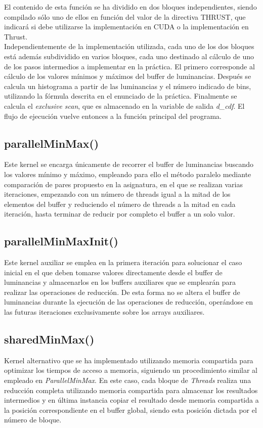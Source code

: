 \documentclass[10pt,oneside,a4paper]{article}
\begin{document}
El contenido de esta función se ha dividido en dos bloques independientes, siendo compilado sólo uno de ellos en función del valor de la directiva THRUST, que indicará si debe utilizarse la implementación en CUDA o la implementación en Thrust.\\

Independientemente de la implementación utilizada, cada uno de los dos bloques está además subdividido en varios bloques, cada uno destinado al cálculo de uno de los pasos intermedios a implementar en la práctica. El primero corresponde al cálculo de los valores mínimos y máximos del buffer de luminancias. Después se calcula un histograma a partir de las luminancias y el número indicado de bins, utilizando la fórmula descrita en el enunciado de la práctica. Finalmente se calcula el \textit{exclusive scan}, que es almacenado en la variable de salida \textit{d\_cdf}. El flujo de ejecución vuelve entonces a la función principal del programa.

\subsection{parallelMinMax()}
Este kernel se encarga únicamente de recorrer el buffer de luminancias buscando los valores mínimo y máximo, empleando para ello el método paralelo mediante comparación de pares propuesto en la asignatura, en el que se realizan varias iteraciones, empezando con un número de threads igual a la mitad de los elementos del buffer y reduciendo el número de threads a la mitad en cada iteración, hasta terminar de reducir por completo el buffer a un solo valor.

\subsection{parallelMinMaxInit()}
Este kernel auxiliar se emplea en la primera iteración para solucionar el caso inicial en el que deben tomarse valores directamente desde el buffer de luminancias y almacenarlos en los buffers auxiliares que se emplearán para realizar las operaciones de reducción. De esta forma no se altera el buffer de luminancias durante la ejecución de las operaciones de reducción, operándose en las futuras iteraciones exclusivamente sobre los arrays auxiliares.

\subsection{sharedMinMax()}
Kernel alternativo que se ha implementado utilizando memoria compartida para optimizar los tiempos de acceso a memoria, siguiendo un procedimiento similar al empleado en \textit{ParallelMinMax}. En este caso, cada bloque de \textit{Threads} realiza una reducción completa utilizando memoria compartida para almacenar los resultados intermedios y en última instancia copiar el resultado desde memoria compartida a la posición correspondiente en el buffer global, siendo esta posición dictada por el número de bloque.\\
\end{document}
